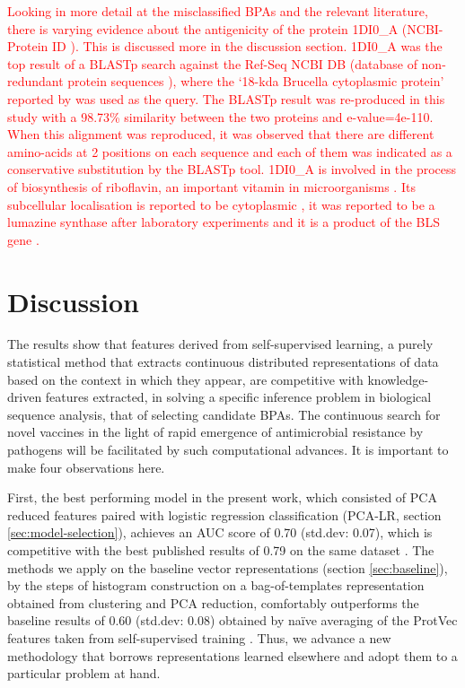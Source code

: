 \documentclass[10pt,journal,compsoc,twoside]{IEEEtran}
\begin{document}
\textcolor{red}{Looking in more detail at the misclassified BPAs and the relevant literature, there is varying evidence about the antigenicity of the protein 1DI0\_A (NCBI-Protein ID \cite{1DI0_A}). This is discussed more in the discussion section. 1DI0\_A was the top result \cite{heinson_2017} of a BLASTp \cite{blast} search against the Ref-Seq NCBI DB (database of non-redundant protein sequences \cite{ncbi-prot-nr-db}), where the ‘18-kda Brucella cytoplasmic protein’ reported by \cite{goldbaum_velikovsky_1999} was used as the query. The BLASTp result was re-produced in this study with a 98.73\% similarity between the two proteins and e-value=4e-110. When this alignment was reproduced, it was observed that there are different amino-acids at 2 positions on each sequence and each of them was indicated as a conservative substitution by the BLASTp tool. 1DI0\_A is involved in the process of biosynthesis of riboflavin, an important vitamin in microorganisms \cite{riboflavin}. Its subcellular localisation is reported to be cytoplasmic \cite{psortb}, it was reported to be a lumazine synthase after laboratory experiments \cite{goldbaum_velikovsky_1999} and it is a product of the BLS gene \cite{BLS}.}


\section{Discussion}
\label{sec:Discussion}

The results show that features derived from self-supervised learning, a purely statistical method that extracts continuous distributed representations of data based on the context in which they appear, are competitive with knowledge-driven features extracted, in solving a specific inference problem in biological sequence analysis, that of selecting candidate BPAs. The continuous search for novel vaccines in the light of rapid emergence of antimicrobial resistance by pathogens will be facilitated by such computational advances. It is important to make four observations here. 

First, the best performing model in the present work, which consisted of PCA reduced features paired with logistic regression classification (PCA-LR, section \ref{sec:model-selection}), achieves an AUC score of 0.70 (std.dev: 0.07), which is competitive with the best published results of 0.79 on the same dataset \cite{heinson_2017} \cite{dalsass_2019}. The methods we apply on the baseline vector representations (section \ref{sec:baseline}), by the steps of histogram construction on a bag-of-templates representation obtained from clustering and PCA reduction, comfortably outperforms the baseline results of 0.60 (std.dev: 0.08) obtained by naïve averaging of the ProtVec features taken from self-supervised training \cite{protvec}. Thus, we advance a new methodology that borrows representations learned elsewhere and adopt them to a particular problem at hand.
\end{document}
